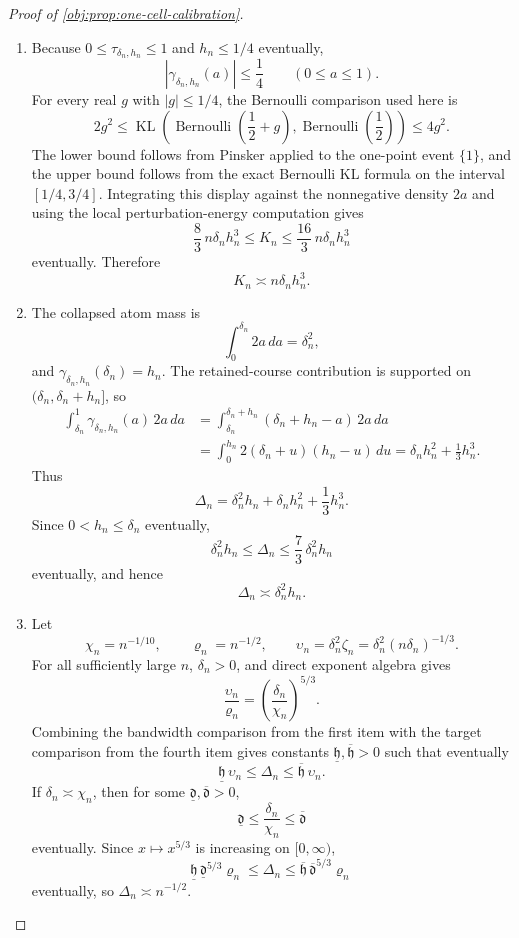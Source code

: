 \documentclass[11pt]{article}
\begin{document}
\begin{proof}[Proof of \cref{obj:prop:one-cell-calibration}]
\begin{enumerate}
\item Because \(0\le\tau_{\delta_n,h_n}\le1\) and \(h_n\le1/4\) eventually,
\[
|\gamma_{\delta_n,h_n}(a)|\le\frac14
\qquad (0\le a\le1).
\]
For every real \(g\) with \(|g|\le1/4\), the Bernoulli comparison used here is
\[
2g^2
\le
\operatorname{KL}\!\left(\operatorname{Bernoulli}\!\left(\frac12+g\right),
\operatorname{Bernoulli}\!\left(\frac12\right)\right)
\le
4g^2 .
\]
The lower bound follows from Pinsker applied to the one-point event
\(\{1\}\), and the upper bound follows from the exact Bernoulli KL formula on
the interval \([1/4,3/4]\).  Integrating this display against the nonnegative
density \(2a\) and using the local perturbation-energy computation gives
\[
\frac83\,n\delta_n h_n^3
\le
K_n
\le
\frac{16}{3}\,n\delta_n h_n^3
\]
eventually.  Therefore
\[
K_n\asymp n\delta_n h_n^3 .
\]

\item The collapsed atom mass is
\[
\int_0^{\delta_n}2a\,da=\delta_n^2,
\]
and \(\gamma_{\delta_n,h_n}(\delta_n)=h_n\).  The retained-course contribution
is supported on \((\delta_n,\delta_n+h_n]\), so
\[
\begin{aligned}
\int_{\delta_n}^1
\gamma_{\delta_n,h_n}(a)\,2a\,da
&=
\int_{\delta_n}^{\delta_n+h_n}
(\delta_n+h_n-a)\,2a\,da  \\
&=
\int_0^{h_n}2(\delta_n+u)(h_n-u)\,du
=
\delta_n h_n^2+\frac13 h_n^3 .
\end{aligned}
\]
Thus
\[
\Delta_n
=
\delta_n^2h_n+\delta_nh_n^2+\frac13 h_n^3 .
\]
Since \(0<h_n\le\delta_n\) eventually,
\[
\delta_n^2h_n
\le
\Delta_n
\le
\frac73\,\delta_n^2h_n
\]
eventually, and hence
\[
\Delta_n\asymp \delta_n^2h_n .
\]

\item Let
\[
\chi_n=n^{-1/10},
\qquad
\varrho_n=n^{-1/2},
\qquad
\upsilon_n=\delta_n^2\zeta_n
=\delta_n^2(n\delta_n)^{-1/3}.
\]
For all sufficiently large \(n\), \(\delta_n>0\), and direct exponent algebra
gives
\[
\frac{\upsilon_n}{\varrho_n}
=
\left(\frac{\delta_n}{\chi_n}\right)^{5/3}.
\]
Combining the bandwidth comparison from the first item with the target
comparison from the fourth item gives constants
\(\underline{\mathfrak h},\overline{\mathfrak h}>0\) such that eventually
\[
\underline{\mathfrak h}\,\upsilon_n
\le
\Delta_n
\le
\overline{\mathfrak h}\,\upsilon_n .
\]
If \(\delta_n\asymp\chi_n\), then for some
\(\underline{\mathfrak d},\overline{\mathfrak d}>0\),
\[
\underline{\mathfrak d}
\le
\frac{\delta_n}{\chi_n}
\le
\overline{\mathfrak d}
\]
eventually.  Since \(x\mapsto x^{5/3}\) is increasing on \([0,\infty)\),
\[
\underline{\mathfrak h}\,\underline{\mathfrak d}^{5/3}\varrho_n
\le
\Delta_n
\le
\overline{\mathfrak h}\,\overline{\mathfrak d}^{5/3}\varrho_n
\]
eventually, so \(\Delta_n\asymp n^{-1/2}\).


\end{enumerate}
\end{proof}
\end{document}
